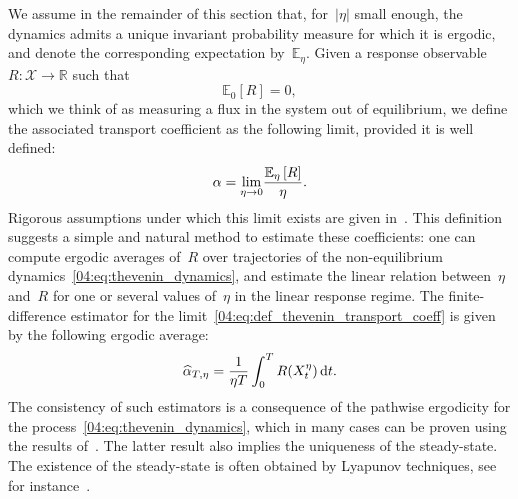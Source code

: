 We assume in the remainder of this section that, for~$|\eta|$ small enough, the dynamics admits a unique invariant probability measure for which it is ergodic, and denote the corresponding expectation by~$\mathbb{E}_\eta$. Given a response observable~$R : \mathcal X \to \mathbb R$ such that
\begin{equation}
\label{04:eq:R_centered_Thevenin}
   \mathbb{E}_0\left[ R\right]=0, 
\end{equation} which we think of as measuring a flux in the system out of equilibrium, we define the associated transport coefficient as the following limit, provided it is well defined:
\begin{equation}
    \label{04:eq:def_thevenin_transport_coeff}
    \alpha = \underset{\eta\to 0}{\lim}\frac{\mathbb{E}_{\eta}\left[R\right]}{\eta}.
\end{equation}
Rigorous assumptions under which this limit exists are given in~\cite{H10}. This definition suggests a simple and natural method to estimate these coefficients: one can compute ergodic averages of~$R$ over trajectories of the non-equilibrium dynamics~\eqref{04:eq:thevenin_dynamics}, and estimate the linear relation between~$\eta$ and~$R$ for one or several values of~$\eta$ in the linear response regime. The finite-difference estimator for the limit~\eqref{04:eq:def_thevenin_transport_coeff} is given by the following ergodic average:
\begin{equation}
    \label{04:eq:thevenin_rho_estimators_continuous_time}
    \widehat{\alpha}_{T,\eta}=\frac1{\eta T}\int_0^T R(X^\eta_t)\,\mathrm{d} t.
\end{equation}
The consistency of such estimators is a consequence of the pathwise ergodicity for the process~\eqref{04:eq:thevenin_dynamics}, which in many cases can be proven using the results of~\cite{K87}. The latter result also implies the uniqueness of the steady-state. The existence of the steady-state is often obtained by Lyapunov techniques, see for instance~\cite[Theorem~8.3]{RB06}.


